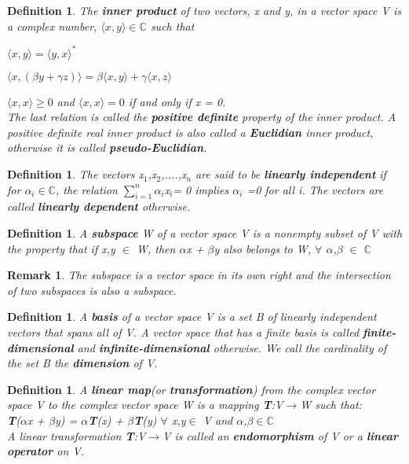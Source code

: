 \documentclass[12pt,a4paper]{article}
\newtheorem{remark}[thm]{Remark}
\newtheorem{defn}[thm]{Definition}
\begin{document}
\begin{defn}
The \textbf{inner product} of two vectors, x and y, in a vector space V is a complex number, $\langle x, y\rangle \in \mathbb{C}$ such that
\item[1.] $\langle x, y \rangle  = \langle y, x \rangle^*$
\item[2.] $\langle x, (\beta y + \gamma z) \rangle = \beta \langle x, y\rangle + \gamma \langle x, z\rangle$
\item[3.]$\langle x,x \rangle \geqslant 0 $ and $ \langle x, x \rangle = 0$ if and only if x = 0.\\
The last relation is called the \textbf{positive definite} property of the inner product. A positive definite real inner product is also called a \textbf{Euclidian} inner product, otherwise it is called \textbf{pseudo-Euclidian}.
\end{defn}
\begin{defn}
The vectors x$_{1}$,x$_{2}$,....,x$_{n}$ are said to be \textbf{linearly independent} if for $\alpha_{i} $$\in$$\mathbb{C}$, the relation $\sum_{i=1}^{n}$$ \alpha_{i}$x$_{i} $= 0 implies $\alpha_{i}$ =0 for all i. The  vectors are called \textbf{linearly dependent} otherwise. 
\end{defn}
\begin{defn}
A \textbf{subspace} W of a vector space V is a nonempty subset of V with the property that if x,y $\in$ W, then $\alpha$x + $\beta$y also belongs to W, $\forall$ $\alpha$,$\beta$ $\in$ $\mathbb{C}$
\end{defn}
\begin{remark}
The subspace is a vector space in its own right and the intersection of two subspaces is also a subspace.
\end{remark}
\begin{defn}
A \textbf{basis} of a vector space V is a set B of linearly independent vectors that spans all of V. A vector space that has a finite basis is called \textbf{finite-dimensional} and \textbf{infinite-dimensional} otherwise. We call the cardinality of the set B the \textbf{dimension} of V.
\end{defn}
\begin{defn}
A \textbf{linear map}(or \textbf{transformation}) from the complex vector space V to the complex vector space W is a mapping \textbf{T}:V$\to$W such that:\\
\hspace{1cm} \textbf{T}($\alpha$x + $\beta$y) = $\alpha$\textbf{T}(x) + $\beta$\textbf{T}(y) $\forall$ x,y$\in$ V and $\alpha$,$\beta$$\in$$\mathbb{C}$\\
A linear transformation \textbf{T}:V$\to$V is called an \textbf{endomorphism} of V or a \textbf{linear operator} on V.
\end{defn}
\end{document}
